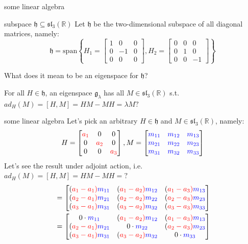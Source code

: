 \documentclass{beamer}
\newcommand{\R}{\mathbb{R}}
\newcounter{mytheorem}[section]
\begin{document}
\addtocounter{mytheorem}{-1}
\begin{frame}{some linear algebra}
\begin{defi}{subspace $\mathfrak{h} \subseteq \mathfrak{sl}_3(\R)$}{}
		Let  $\mathfrak{h}$ be the two-dimensional subspace of all diagonal matrices, namely:  \[
			\mathfrak{h} = \text{span}{\left\{ H_1 = \begin{bmatrix} 1 & 0 &0 \\ 0 & -1 & 0 \\ 0 &0 &0 \end{bmatrix}, H_2 = \begin{bmatrix} 0 &0 &0 \\ 0 &1&0 \\ 0&0&-1 \end{bmatrix}   \right\} }
		\] 
\end{defi}
What does it mean to be an eigenspace for $\mathfrak{h}$?

For all $H \in \mathfrak{h}$, an eigenspace $\mathfrak{g}_{\lambda}$ has all $M \in \mathfrak{sl}_{3}(\R)$ s.t. $ad_{H}(M) = [H,M] = HM-MH = \lambda M?$
\end{frame}


\begin{frame}{some linear algebra}
Let's pick an arbitrary $H \in \mathfrak{h}$ and $M \in \mathfrak{sl}_3(\R)$, namely: \[
		H = \def\a{\color{red}a} \begin{bmatrix} \a_1 & 0 & 0 \\ 0 & \a_2 &0 \\ 0 &0 &\a_3 \end{bmatrix}, M = \def\m{\color{blue}m} \begin{bmatrix} \m_{11} & \m_{12} & \m_{13} \\ \m_{21} & \m_{22} & \m_{23} \\ \m_{31} & \m_{32} & \m_{33} \end{bmatrix} 
	\]
Let's see the result under adjoint action, i.e. $ad_{H}(M) = [H,M] = HM-MH = ?$
	\begin{align*}
		[H,M] &= \def\a{\color{red}a} \def\m{\color{blue}m} \begin{bmatrix} (\a_1-\a_1)\m_{11} & (\a_1-\a_2)\m_{12} & (\a_1-\a_3)\m_{13} \\ (\a_2-\a_1)\m_{21} & (\a_2-\a_2)\m_{22} & (\a_2-\a_3)\m_{23} \\ (\a_3-\a_1)\m_{31} & (\a_3-\a_2)\m_{32} & (\a_3-\a_3)\m_{33} \end{bmatrix} \\
		      &=  \def\a{\color{red}a} \def\m{\color{blue}m} \begin{bmatrix} 0 \cdot \m_{11} & (\a_1-\a_2)\m_{12} & (\a_1-\a_3)\m_{13} \\ (\a_2-\a_1)\m_{21} & 0 \cdot \m_{22} & (\a_2-\a_3)\m_{23} \\ (\a_3-\a_1)\m_{31} & (\a_3-\a_2)\m_{32} & 0 \cdot \m_{33} \end{bmatrix} 
	\end{align*}
\end{frame}
\end{document}
